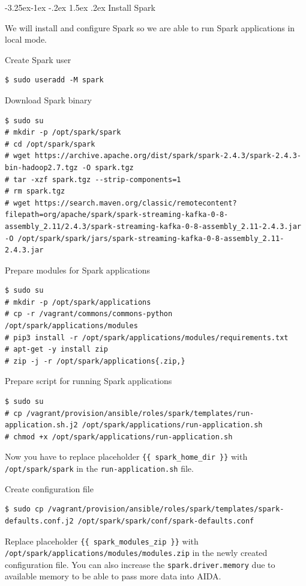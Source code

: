 \documentclass[a4paper]{article} %
\makeatletter
\renewcommand{\normalsize}{\fontsize{12}{15}\selectfont\color{textcolor}}
\renewcommand\subsubsection{\@startsection{subsubsection}{3}{\z@}%
                   {-3.25ex\@plus -1ex \@minus -.2ex}%
                   {1.5ex \@plus .2ex}%
                   {\normalfont\sffamily\normalsize\bfseries\color{projectcolor}}}
\makeatother
\begin{document}
\subsubsection{Install Spark}

We will install and configure Spark so we are able to run Spark applications in local mode.

Create Spark user
\begin{lstlisting}
$ sudo useradd -M spark
\end{lstlisting}

Download Spark binary
\begin{lstlisting}
$ sudo su
# mkdir -p /opt/spark/spark
# cd /opt/spark/spark
# wget https://archive.apache.org/dist/spark/spark-2.4.3/spark-2.4.3-bin-hadoop2.7.tgz -O spark.tgz
# tar -xzf spark.tgz --strip-components=1
# rm spark.tgz
# wget https://search.maven.org/classic/remotecontent?filepath=org/apache/spark/spark-streaming-kafka-0-8-assembly_2.11/2.4.3/spark-streaming-kafka-0-8-assembly_2.11-2.4.3.jar -O /opt/spark/spark/jars/spark-streaming-kafka-0-8-assembly_2.11-2.4.3.jar
\end{lstlisting}

Prepare modules for Spark applications
\begin{lstlisting}
$ sudo su
# mkdir -p /opt/spark/applications
# cp -r /vagrant/commons/commons-python /opt/spark/applications/modules
# pip3 install -r /opt/spark/applications/modules/requirements.txt
# apt-get -y install zip
# zip -j -r /opt/spark/applications{.zip,}
\end{lstlisting}

Prepare script for running Spark applications
\begin{lstlisting}
$ sudo su
# cp /vagrant/provision/ansible/roles/spark/templates/run-application.sh.j2 /opt/spark/applications/run-application.sh
# chmod +x /opt/spark/applications/run-application.sh
\end{lstlisting}

Now you have to replace placeholder \texttt{\{\{ spark\_home\_dir \}\}} with \texttt{/opt/spark/spark}
in the \texttt{run-application.sh} file.

Create configuration file
\begin{lstlisting}
$ sudo cp /vagrant/provision/ansible/roles/spark/templates/spark-defaults.conf.j2 /opt/spark/spark/conf/spark-defaults.conf
\end{lstlisting}

Replace placeholder \texttt{\{\{ spark\_modules\_zip \}\}} with \texttt{/opt/spark/applications/modules/modules.zip}
in the newly created configuration file. You can also increase the \texttt{spark.driver.memory} due to available
memory to be able to pass more data into AIDA.
\end{document}
